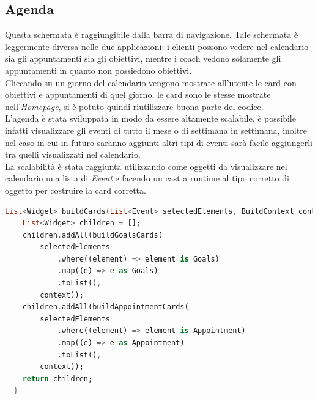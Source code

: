 \subsection{Agenda}
Questa schermata è raggiungibile dalla barra di navigazione. Tale schermata è leggermente diversa nelle due applicazioni: i clienti possono vedere nel calendario sia gli appuntamenti sia gli obiettivi, mentre i coach vedono solamente gli appuntamenti in quanto non possiedono obiettivi.\\
Cliccando su un giorno del calendario vengono mostrate all'utente le card con obiettivi e appuntamenti di quel giorno, le card sono le stesse mostrate nell'\textit{Homepage}, si è potuto quindi riutilizzare buona parte del codice.\\
L'agenda è stata sviluppata in modo da essere altamente scalabile, è possibile infatti visualizzare gli eventi di tutto il mese o di settimana in settimana, inoltre nel caso in cui in futuro saranno aggiunti altri tipi di eventi sarà facile aggiungerli tra quelli visualizzati nel calendario.\\
La scalabilità è stata raggiunta utilizzando come oggetti da visualizzare nel calendario una lista di \textit{Event} e facendo un cast a runtime al tipo corretto di oggetto per costruire la card corretta.
\begin{lstlisting}[language=dart, firstnumber=1,caption={Costruzione delle card con individuazione a runtime del tipo}]
List<Widget> buildCards(List<Event> selectedElements, BuildContext context) {
    List<Widget> children = [];
    children.addAll(buildGoalsCards(
        selectedElements
            .where((element) => element is Goals)
            .map((e) => e as Goals)
            .toList(),
        context));
    children.addAll(buildAppointmentCards(
        selectedElements
            .where((element) => element is Appointment)
            .map((e) => e as Appointment)
            .toList(),
        context));
    return children;
  }
\end{lstlisting}
